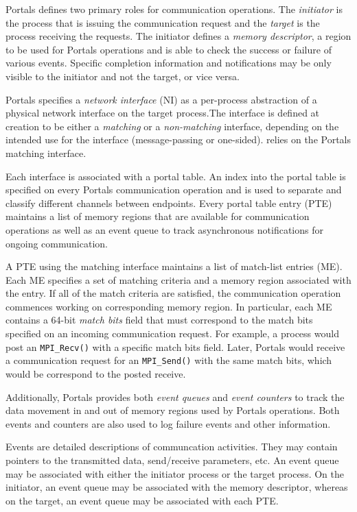 Portals defines two primary roles for communication operations. The
{\em initiator} is the process that is issuing the communication
request and the {\em target} is the process receiving the
requests. The initiator defines a {\em memory descriptor}, a
region to be used for Portals operations and is able to check the
success or failure of various events. Specific completion information
and notifications may be only visible to the initiator and not the
target, or vice versa.

Portals specifies a {\em network interface} (NI) as a per-process
abstraction of a physical network interface on the target process.The
interface is defined at creation to be either a {\em matching}
or a {\em non-matching} interface, depending on the intended use for
the interface (message-passing or one-sided). \pdht relies on the
Portals matching interface.

Each interface is associated with a portal table. An index into the
portal table is specified on every Portals communication operation and
is used to separate and classify different channels between endpoints.
Every portal table entry (PTE) maintains a list of memory regions that
are available for communication operations as well as an event queue
to track asynchronous notifications for ongoing communication.

A PTE using the matching interface maintains a list of match-list
entries (ME). Each ME specifies a set of matching criteria and a
memory region associated with the entry. If all of the match criteria
are satisfied, the communication operation commences working on
corresponding memory region. In particular, each ME contains a 64-bit
{\em match bits} field that must correspond to the match bits
specified on an incoming communication request. For example, a process
would post an {\tt MPI\_Recv()} with a specific match bits
field. Later, Portals would receive a communication request for an
{\tt MPI\_Send()} with the same match bits, which would be correspond
to the posted receive.

Additionally, Portals provides both {\em event queues} and {\em event
  counters} to track the data movement in and out of memory regions
used by Portals operations. Both events and counters are also used to
log failure events and other information. 

Events are detailed descriptions of communcation activities. They may
contain pointers to the transmitted data, send/receive parameters,
etc. An event queue may be associated with either the initiator
process or the target process.  On the initiator, an event queue may
be associated with the memory descriptor, whereas on the target,
an event queue may be associated with each PTE. 

